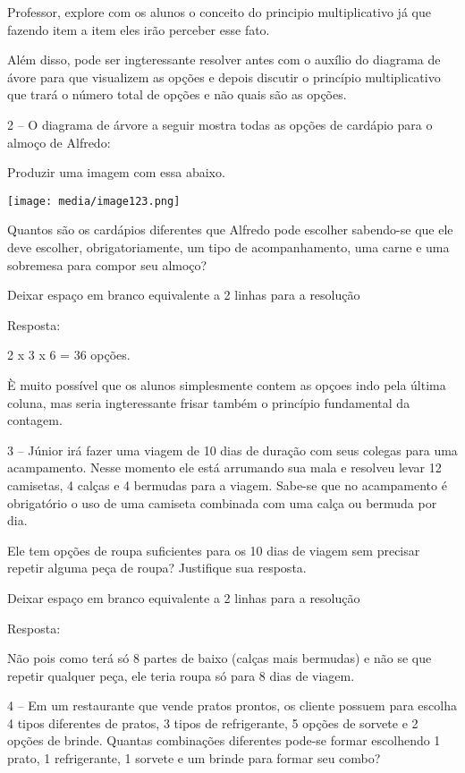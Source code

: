 Professor, explore com os alunos o conceito do principio multiplicativo
já que fazendo item a item eles irão perceber esse fato.

Além disso, pode ser ingteressante resolver antes com o auxílio do
diagrama de ávore para que visualizem as opções e depois discutir o
princípio multiplicativo que trará o número total de opções e não quais
são as opções.

2 -- O diagrama de árvore a seguir mostra todas as opções de cardápio
para o almoço de Alfredo:

Produzir uma imagem com essa abaixo.

\texttt{[image: media/image123.png]}

Quantos são os cardápios diferentes que Alfredo pode escolher sabendo-se
que ele deve escolher, obrigatoriamente, um tipo de acompanhamento, uma
carne e uma sobremesa para compor seu almoço?

Deixar espaço em branco equivalente a 2 linhas para a resolução

Resposta:

2 x 3 x 6 = 36 opções.

È muito possível que os alunos simplesmente contem as opçoes indo pela
última coluna, mas seria ingteressante frisar também o princípio
fundamental da contagem.

3 -- Júnior irá fazer uma viagem de 10 dias de duração com seus colegas
para uma acampamento. Nesse momento ele está arrumando sua mala e
resolveu levar 12 camisetas, 4 calças e 4 bermudas para a viagem.
Sabe-se que no acampamento é obrigatório o uso de uma camiseta combinada
com uma calça ou bermuda por dia.

Ele tem opções de roupa suficientes para os 10 dias de viagem sem
precisar repetir alguma peça de roupa? Justifique sua resposta.

Deixar espaço em branco equivalente a 2 linhas para a resolução

Resposta:

Não pois como terá só 8 partes de baixo (calças mais bermudas) e não se
que repetir qualquer peça, ele teria roupa só para 8 dias de viagem.

4 -- Em um restaurante que vende pratos prontos, os cliente possuem para
escolha 4 tipos diferentes de pratos, 3 tipos de refrigerante, 5 opções
de sorvete e 2 opções de brinde. Quantas combinações diferentes pode-se
formar escolhendo 1 prato, 1 refrigerante, 1 sorvete e um brinde para
formar seu combo?

